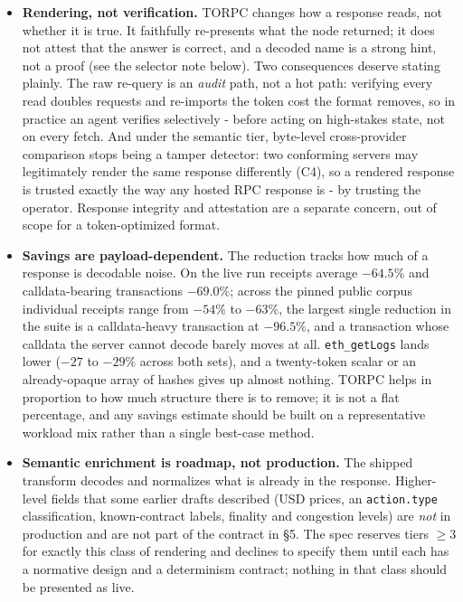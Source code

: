 \documentclass[11pt]{article}
\newcommand{\code}[1]{\texttt{#1}}
\begin{document}
\begin{itemize}[leftmargin=1.4em, itemsep=4pt, topsep=3pt]
\item \textbf{Rendering, not verification.} TORPC changes how a response reads, not whether it is true. It faithfully re-presents what the node returned; it does not attest that the answer is correct, and a decoded name is a strong hint, not a proof (see the selector note below). Two consequences deserve stating plainly. The raw re-query is an \emph{audit} path, not a hot path: verifying every read doubles requests and re-imports the token cost the format removes, so in practice an agent verifies selectively - before acting on high-stakes state, not on every fetch. And under the semantic tier, byte-level cross-provider comparison stops being a tamper detector: two conforming servers may legitimately render the same response differently (C4), so a rendered response is trusted exactly the way any hosted RPC response is - by trusting the operator. Response integrity and attestation are a separate concern, out of scope for a token-optimized format.
\item \textbf{Savings are payload-dependent.} The reduction tracks how much of a response is decodable noise. On the live run receipts average $-64.5\%$ and calldata-bearing transactions $-69.0\%$; across the pinned public corpus individual receipts range from $-54\%$ to $-63\%$, the largest single reduction in the suite is a calldata-heavy transaction at $-96.5\%$, and a transaction whose calldata the server cannot decode barely moves at all. \code{eth\_getLogs} lands lower ($-27$ to $-29\%$ across both sets), and a twenty-token scalar or an already-opaque array of hashes gives up almost nothing. TORPC helps in proportion to how much structure there is to remove; it is not a flat percentage, and any savings estimate should be built on a representative workload mix rather than a single best-case method.
\item \textbf{Semantic enrichment is roadmap, not production.} The shipped transform decodes and normalizes what is already in the response. Higher-level fields that some earlier drafts described (USD prices, an \code{action.type} classification, known-contract labels, finality and congestion levels) are \emph{not} in production and are not part of the contract in \S5. The spec reserves tiers $\geq 3$ for exactly this class of rendering and declines to specify them until each has a normative design and a determinism contract; nothing in that class should be presented as live.

\end{itemize}
\end{document}
